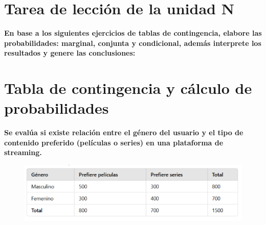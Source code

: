 \documentclass[12pt]{article}
\begin{document}
    

    \section*{\centering  Tarea de lección de la unidad N} 
    \vspace{0.5cm}\textbf{En base a los siguientes ejercicios de tablas de contingencia, elabore las
    probabilidades: marginal, conjunta y condicional, además interprete los
    resultados y genere las conclusiones:} \vspace{0.5cm}

    \section*{\centering Tabla de contingencia y cálculo de probabilidades}

        \vspace{0.5cm}\textbf{Se evalúa si existe relación entre el género del usuario y el tipo de
        contenido preferido (películas o series) en una plataforma de
        streaming.} \vspace{0.5cm}

        \begin{figure}[ht]
            \centering
            \includegraphics[width=1\textwidth]{img/tabla_contigencia.png}
        \end{figure}
\end{document}
